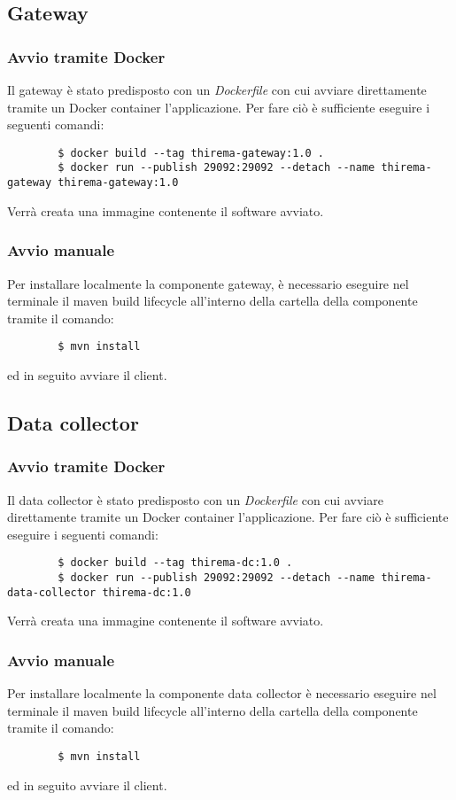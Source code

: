 	\subsection{Gateway}
		
		\subsubsection{Avvio tramite Docker}
		Il gateway è stato predisposto con un \textit{Dockerfile} con cui avviare direttamente tramite un Docker container l'applicazione. Per fare ciò è sufficiente eseguire i seguenti comandi:
		\begin{verbatim}
		$ docker build --tag thirema-gateway:1.0 .
		$ docker run --publish 29092:29092 --detach --name thirema-gateway thirema-gateway:1.0
		\end{verbatim}
		Verrà creata una immagine contenente il software avviato.

		\subsubsection{Avvio manuale}
		Per installare localmente la componente gateway, è necessario eseguire nel terminale il maven build lifecycle all'interno della cartella della componente tramite il comando:
		\begin{verbatim}
		$ mvn install
		\end{verbatim}
		ed in seguito avviare il client.

	\subsection{Data collector}

		\subsubsection{Avvio tramite Docker}
		Il data collector è stato predisposto con un \textit{Dockerfile} con cui avviare direttamente tramite un Docker container l'applicazione. Per fare ciò è sufficiente eseguire i seguenti comandi:
		\begin{verbatim}
		$ docker build --tag thirema-dc:1.0 .
		$ docker run --publish 29092:29092 --detach --name thirema-data-collector thirema-dc:1.0
		\end{verbatim}
		Verrà creata una immagine contenente il software avviato.

		\subsubsection{Avvio manuale}
		Per installare localmente la componente data collector è necessario eseguire nel terminale il maven build lifecycle all'interno della cartella della componente tramite il comando:
		\begin{verbatim}
		$ mvn install
		\end{verbatim}
		ed in seguito avviare il client.

